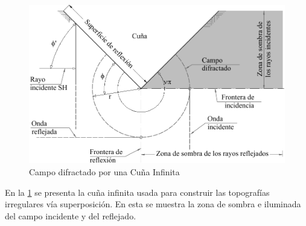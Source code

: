 \documentclass[spanish,letterpaper,12pt,twoside,openany]{article}
\begin{document}
%
\begin{figure}[H]
	\centering
	\includegraphics[width=10 cm]{img/GeneralDifraction.pdf}
	\caption{Campo difractado por una Cuña Infinita}
	\label{fig:gendif}
\end{figure}
%
En la \cref{fig:gendif} se presenta la cuña infinita usada para construir las topografías irregulares vía superposición. En esta se muestra la zona de sombra e iluminada del campo incidente y del reflejado.
\end{document}
